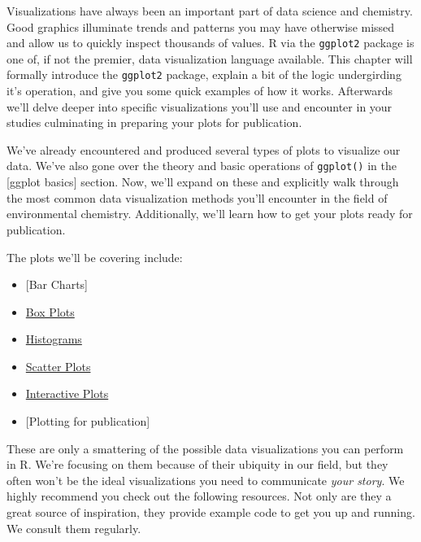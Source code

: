 \documentclass[
]{book}
\providecommand{\tightlist}{%
  \setlength{\itemsep}{0pt}\setlength{\parskip}{0pt}}
\begin{document}
Visualizations have always been an important part of data science and chemistry. Good graphics illuminate trends and patterns you may have otherwise missed and allow us to quickly inspect thousands of values. R via the \texttt{ggplot2} package is one of, if not the premier, data visualization language available. This chapter will formally introduce the \texttt{ggplot2} package, explain a bit of the logic undergirding it's operation, and give you some quick examples of how it works. Afterwards we'll delve deeper into specific visualizations you'll use and encounter in your studies culminating in preparing your plots for publication.

We've already encountered and produced several types of plots to visualize our data. We've also gone over the theory and basic operations of \texttt{ggplot()} in the {[}ggplot basics{]} section. Now, we'll expand on these and explicitly walk through the most common data visualization methods you'll encounter in the field of environmental chemistry. Additionally, we'll learn how to get your plots ready for publication.

The plots we'll be covering include:

\begin{itemize}
\tightlist
\item
  {[}Bar Charts{]}
\item
  \protect\hyperlink{box-plots}{Box Plots}
\item
  \protect\hyperlink{histograms}{Histograms}
\item
  \protect\hyperlink{scatter-plots}{Scatter Plots}
\item
  \protect\hyperlink{interactive-plots}{Interactive Plots}
\item
  {[}Plotting for publication{]}
\end{itemize}

These are only a smattering of the possible data visualizations you can perform in R. We're focusing on them because of their ubiquity in our field, but they often won't be the ideal visualizations you need to communicate \emph{your story}. We highly recommend you check out the following resources. Not only are they a great source of inspiration, they provide example code to get you up and running. We consult them regularly.
\end{document}
